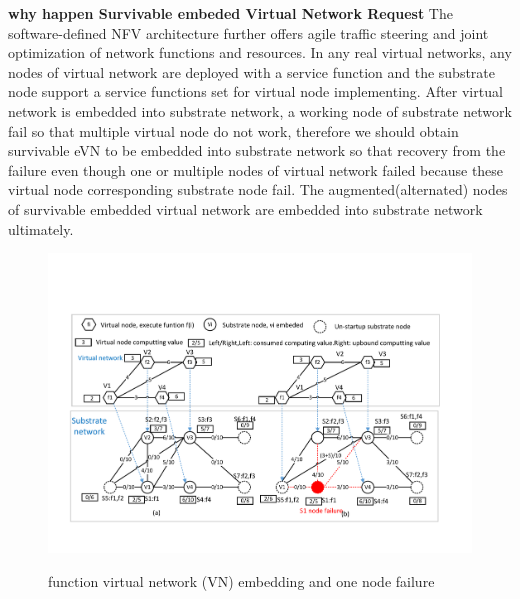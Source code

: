 \textbf{why happen Survivable embeded Virtual Network Request} The software-defined NFV architecture further offers agile traffic steering and joint optimization of network functions and resources.
In any real virtual networks, any nodes of virtual network  are deployed with a service function and the substrate node support a service functions set for virtual node implementing. After virtual network is embedded into substrate network, a working node of substrate network fail so that  multiple virtual node do not work, therefore we should obtain survivable eVN to be embedded into substrate network so that recovery from the failure even though one or multiple nodes of virtual network failed because these virtual node corresponding substrate node fail. The augmented(alternated) nodes of survivable embedded virtual network are embedded into substrate network ultimately.

\begin{figure}
  \centering
  \includegraphics[width=5in]{Fig/VNmapSN}\\
  \caption{function virtual network (VN) embedding and one node failure}\label{fig:VNmapSN}
\end{figure}



